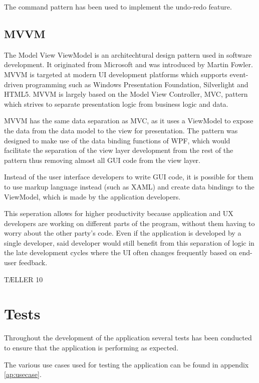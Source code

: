 The command pattern has been used to implement the undo-redo feature.

\subsection{MVVM}
The Model View ViewModel is an architechtural design pattern used in software development. It originated from Microsoft and was introduced by Martin Fowler.
MVVM is targeted at modern UI development platforms which supports event-driven programming such as Windows Presentation Foundation, Silverlight and HTML5.
MVVM is largely based on the Model View Controller, MVC, pattern which strives to separate presentation logic from business logic and data.

MVVM has the same data separation as MVC, as it uses a ViewModel to expose the data from the data model to the view for presentation.
The pattern was designed to make use of the data binding functions of WPF, which would facilitate the separation of the view layer development
from the rest of the pattern thus removing almost all GUI code from the view layer.

Instead of the user interface developers to write GUI code, it is possible for them to use markup language instead (such as XAML)
and create data bindings to the ViewModel, which is made by the application developers.

This seperation allows for higher productivity because application and UX developers are working on different parts of the program, 
without them having to worry about the other party's code.
Even if the application is developed by a single developer, said developer would still benefit from this separation of logic 
in the late development cycles where the UI often changes frequently based on end-user feedback.

TÆLLER 10


\section{Tests}
\label{sec:tests}
Throughout the development of the application several tests has been conducted to ensure that the application is performing as expected.

The various use cases used for testing the application can be found in appendix \ref{ap:usecase}.